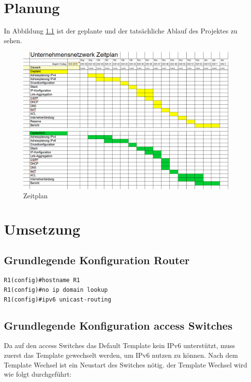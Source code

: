 \documentclass[11pt,a4paper]{scrreprt}
\begin{document}
\newpage
\chapter{Planung}
In Abbildung \ref{abb:Zeitplan} ist der geplante und der tatsächliche Ablauf des Projektes zu sehen. 
\begin{figure}[H]
\begin{center}
\includegraphics[angle=90,scale=0.52]{Zeitplan.png}
\caption{Zeitplan}
\label{abb:Zeitplan}
\end{center}
\end{figure}

\chapter{Umsetzung}


\section{Grundlegende Konfiguration Router}

 \begin{lstlisting}[frame=single, captionpos=b,caption= Router Grund Konfig]
R1(config)#hostname R1
R1(config)#no ip domain lookup
R1(config)#ipv6 unicast-routing
\end{lstlisting}

\section{Grundlegende Konfiguration access Switches}
Da auf den access Switches das Default Template kein IPv6 unterstützt, muss zuerst das Template gewechselt werden, um IPv6 nutzen zu können. Nach dem Template Wechsel ist ein Neustart des Switches nötig. der Template Wechsel wird wie folgt durchgeführt:
\newline
\end{document}
